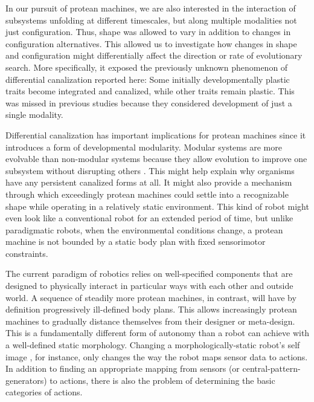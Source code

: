 In our pursuit of 
protean machines,
we are also interested in the interaction of subsystems unfolding at different timescales, but 
along multiple modalities not just configuration.
Thus, shape was allowed to vary in addition to changes in configuration alternatives.
This allowed us to investigate how changes in shape and configuration might differentially affect the direction or rate of evolutionary search.
More specifically, it exposed the previously unknown phenomenon of differential canalization reported here:
Some initially developmentally plastic traits become integrated and canalized, while other traits remain plastic.
This was missed in previous studies because they considered development of just a single modality.

Differential canalization has important implications for protean machines since it introduces a form of developmental modularity.
Modular systems are more evolvable than non-modular systems because they allow evolution to improve one subsystem without disrupting others \cite{wagner1996perspective,lipson2007principles}.
This might help explain why organisms have any persistent canalized forms at all.
It might also provide a mechanism through which exceedingly protean machines could settle into a recognizable shape while operating in a relatively static environment.
This kind of robot might even look like a conventional robot for an extended period of time, but unlike paradigmatic robots, when the environmental conditions change, a protean machine is not bounded by a static body plan with fixed sensorimotor constraints.

The current paradigm of robotics relies on well-specified components that are designed to physically interact in particular ways with each other and outside world.
A sequence of steadily more protean machines, in contrast, will have by definition progressively ill-defined body plans.
This allows increasingly protean machines to gradually distance themselves from their designer or meta-design.
This is a fundamentally different form of autonomy than a robot can achieve with a well-defined static morphology.
Changing a morphologically-static robot's self image \cite{bongard2006resilient,cully2015robots}, for instance, 
only changes the way the robot maps sensor data to actions.
In addition to finding an appropriate mapping from sensors (or central-pattern-generators) to actions, there is also the problem of determining the basic categories of actions.

